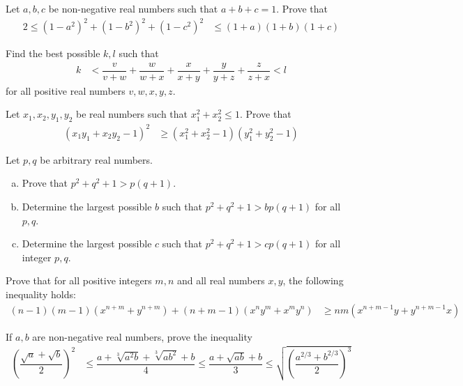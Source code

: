 \documentclass{subfile}
\begin{document}
		\begin{problem}
			Let $a,b,c$ be non-negative real numbers such that $a+b+c=1$. Prove that
				\begin{align*}
					2\leq(1-a^{2})^{2}+(1-b^{2})^{2}+(1-c^{2})^{2}
						& \leq (1+a)(1+b)(1+c)
				\end{align*}
		\end{problem}
	
		\begin{problem}
			Find the best possible $k,l$ such that
				\begin{align*}
					k
						& <\dfrac{v}{v+w}+\dfrac{w}{w+x}+\dfrac{x}{x+y}+\dfrac{y}{y+z}+\dfrac{z}{z+x}<l
				\end{align*}
			for all positive real numbers $v,w,x,y,z$.
		\end{problem}
	
		\begin{problem}
			Let $x_{1},x_{2},y_{1},y_{2}$ be real numbers such that $x_{1}^{2}+x_{2}^{2}\leq1$. Prove that
				\begin{align*}
					(x_{1}y_{1}+x_{2}y_{2}-1)^{2}
						& \geq(x_{1}^{2}+x_{2}^{2}-1)(y_{1}^{2}+y_{2}^{2}-1)
				\end{align*}
		\end{problem}
	
		\begin{problem}
			Let $p,q$ be arbitrary real numbers.
				\begin{enumerate}[(a)]
					\item Prove that $p^2+q^2+1>p(q+1)$.
					\item Determine the largest possible $b$ such that $p^{2}+q^{2}+1>bp(q+1)$ for all $p,q$.
					\item Determine the largest possible $c$ such that $p^{2}+q^{2}+1>cp(q+1)$ for all integer $p,q$.
				\end{enumerate}
		\end{problem}
	
		\begin{problem}
			Prove that for all positive integers $m,n$ and all real numbers $x,y$, the following inequality holds:
				\begin{align*}
					(n-1)(m-1)\left(x^{n+m}+y^{n+m}\right)+(n+m-1)\left(x^{n}y^{m}+x^{m}y^{n}\right)
						& \geq nm\left(x^{n+m-1}y+y^{n+m-1}x\right)
				\end{align*}
		\end{problem}
	
		\begin{problem}
			If $a,b$ are non-negative real numbers, prove the inequality
				\begin{align*}
					\left(\dfrac{\sqrt{a}+\sqrt{b}}{2}\right)^{2}
						& \leq \dfrac{a+\sqrt[3]{a^{2}b}+\sqrt[3]{ab^{2}}+b}{4}\leq\dfrac{a+\sqrt{ab}+b}{3}\leq\sqrt{\left(\dfrac{a^{2/3}+b^{2/3}}{2}\right)^{3}}
				\end{align*}
		\end{problem}
\end{document}
